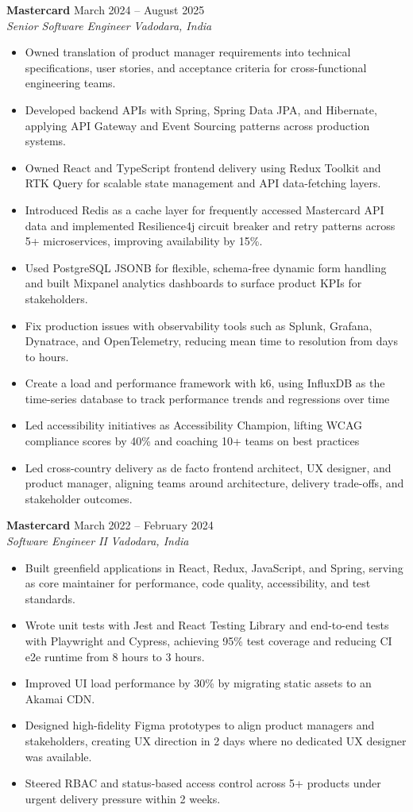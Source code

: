 \documentclass[a4paper,10pt]{article}
\newcommand{\role}[4]{
  \textbf{\color{accent}#1} \hfill {\small #2}\\
  \textit{#3} \hfill {\small \textit{#4}}
}
\begin{document}
\role{Mastercard}{March 2024 -- August 2025}{Senior Software Engineer}{Vadodara, India}
\begin{itemize}
  \item Owned translation of product manager requirements into technical specifications, user stories, and acceptance criteria for cross-functional engineering teams.
  \item Developed backend APIs with Spring, Spring Data JPA, and Hibernate, applying API Gateway and Event Sourcing patterns across production systems.
  \item Owned React and TypeScript frontend delivery using Redux Toolkit and RTK Query for scalable state management and API data-fetching layers.
  \item Introduced Redis as a cache layer for frequently accessed Mastercard API data and implemented Resilience4j circuit breaker and retry patterns across 5+ microservices, improving availability by 15\%.
  \item Used PostgreSQL JSONB for flexible, schema-free dynamic form handling and built Mixpanel analytics dashboards to surface product KPIs for stakeholders.
  \item Fix production issues with observability tools such as Splunk, Grafana, Dynatrace, and OpenTelemetry, reducing mean time to resolution from days to hours.
\item Create a load and performance framework with k6, using InfluxDB as the time-series database to track performance trends and regressions over time
\item Led accessibility initiatives as Accessibility Champion, lifting WCAG compliance scores by 40\% and coaching 10+ teams on best practices

  \item Led cross-country delivery as de facto frontend architect, UX designer, and product manager, aligning teams around architecture, delivery trade-offs, and stakeholder outcomes.
\end{itemize}

\role{Mastercard}{March 2022 -- February 2024}{Software Engineer II}{Vadodara, India}
\begin{itemize}
  \item Built greenfield applications in React, Redux, JavaScript, and Spring, serving as core maintainer for performance, code quality, accessibility, and test standards.
  \item Wrote unit tests with Jest and React Testing Library and end-to-end tests with Playwright and Cypress, achieving 95\% test coverage and reducing CI e2e runtime from 8 hours to 3 hours.
  \item Improved UI load performance by 30\% by migrating static assets to an Akamai CDN.
  \item Designed high-fidelity Figma prototypes to align product managers and stakeholders, creating UX direction in 2 days where no dedicated UX designer was available.
  \item Steered RBAC and status-based access control across 5+ products under urgent delivery pressure within 2 weeks.
\end{itemize}
\end{document}
